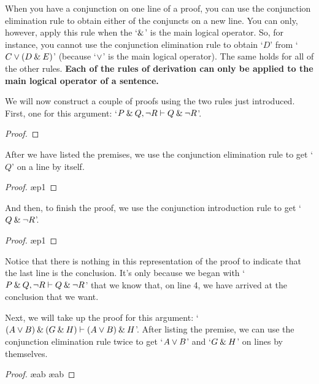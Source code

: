When you have a conjunction on one line of a proof, you can use the conjunction elimination rule to obtain either of the conjuncts on a new line. You can only, however, apply this rule when the `$\mathbin{\&}$' is the main logical operator. So, for instance, you cannot use the conjunction elimination rule to obtain `$D$' from `$C \vee (D \mathbin{\&} E)$' (because `$\vee$' is the main logical operator). The same holds for all of the other rules. \textbf{Each of the rules of derivation can only be applied to the main logical operator of a sentence.}\label{rule-proofs-main-operator}
\bigskip

\noindent We will now construct a couple of proofs using the two rules just introduced.  First, one for this argument: `$P \mathbin{\&} Q, {\neg} R \vdash Q \mathbin{\&} {\neg} R$'.

\begin{proof}
	 \pr{}
	 \pr{}
\end{proof}\medskip

\noindent After we have listed the premises, we use the conjunction elimination rule to get `$Q$' on a line by itself.

\begin{proof}
	 \pr{}
	 \pr{}
	 \ae{p1}
\end{proof}\medskip

\noindent And then, to finish the proof, we use the conjunction introduction rule to get `$Q \mathbin{\&} {\neg} R$'.

\begin{proof}
	 \pr{}
	 \pr{}
	 \ae{p1}
	 
\end{proof}\medskip
Notice that there is nothing in this representation of the proof to indicate that the last line is the conclusion. It's only because we began with `$P \mathbin{\&} Q, {\neg} R \vdash Q \mathbin{\&} {\neg} R$' that we know that, on line 4, we have arrived at the conclusion that we want.

Next, we will take up the proof for this argument: `$(A\vee B) \mathbin{\&} (G \mathbin{\&} H) \vdash (A\vee B)\mathbin{\&} H$'. After listing the premise, we can use the conjunction elimination rule twice to get `$A\vee B$' and `$G\mathbin{\&} H$' on lines by themselves.
\begin{proof}
	 \pr{}
	 \ae{ab}
	 \ae{ab}
\end{proof}

